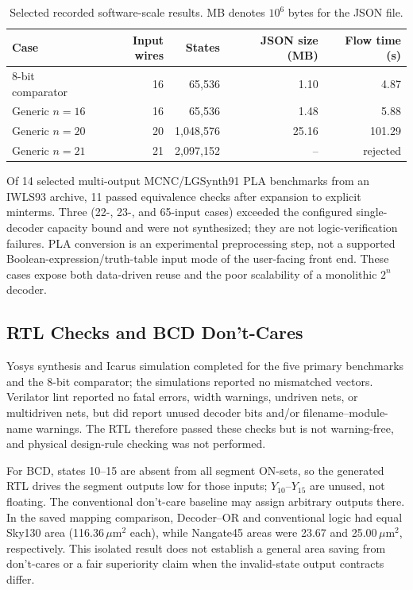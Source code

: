 \documentclass[runningheads]{llncs}
\begin{document}
\begin{table}[t]
\caption{Selected recorded software-scale results. MB denotes $10^6$ bytes for the JSON file.}
\label{tab:scale}
\centering\small
\begin{tabular}{lrrrr}
\toprule
Case & Input wires & States & JSON size (MB) & Flow time (s) \\
\midrule
8-bit comparator & 16 & 65,536 & 1.10 & 4.87 \\
Generic $n=16$ & 16 & 65,536 & 1.48 & 5.88 \\
Generic $n=20$ & 20 & 1,048,576 & 25.16 & 101.29 \\
Generic $n=21$ & 21 & 2,097,152 & -- & rejected \\
\bottomrule
\end{tabular}
\end{table}

Of 14 selected multi-output MCNC/LGSynth91 PLA benchmarks from an IWLS93 archive, 11 passed equivalence checks after expansion to explicit minterms. Three (22-, 23-, and 65-input cases) exceeded the configured single-decoder capacity bound and were not synthesized; they are not logic-verification failures. PLA conversion is an experimental preprocessing step, not a supported Boolean-expression/truth-table input mode of the user-facing front end. These cases expose both data-driven reuse and the poor scalability of a monolithic $2^n$ decoder.

\subsection{RTL Checks and BCD Don't-Cares}
Yosys synthesis and Icarus simulation completed for the five primary benchmarks and the 8-bit comparator; the simulations reported no mismatched vectors. Verilator lint reported no fatal errors, width warnings, undriven nets, or multidriven nets, but did report unused decoder bits and/or filename--module-name warnings. The RTL therefore passed these checks but is not warning-free, and physical design-rule checking was not performed.

For BCD, states 10--15 are absent from all segment ON-sets, so the generated RTL drives the segment outputs low for those inputs; $Y_{10}$--$Y_{15}$ are unused, not floating. The conventional don't-care baseline may assign arbitrary outputs there. In the saved mapping comparison, Decoder--OR and conventional logic had equal Sky130 area (116.36\,$\mu\mathrm{m}^2$ each), while Nangate45 areas were 23.67 and 25.00\,$\mu\mathrm{m}^2$, respectively. This isolated result does not establish a general area saving from don't-cares or a fair superiority claim when the invalid-state output contracts differ.
\end{document}
